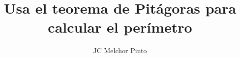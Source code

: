 \documentclass[12pt,addpoints]{guia}
\title{Usa el teorema de Pitágoras para calcular el perímetro}
\author{JC Melchor Pinto}
\begin{document}
\INFO%
\begin{multicols}{2}%
    
    
    
    \columnbreak
    
    
\end{multicols}
\ejemplosboxed[]
\begin{questions}
    \questionboxed[10]{}
    \questionboxed[10]{}
    \ejemplosboxed[]
    \questionboxed[15]{}
    \ejemplosboxed[]
    \questionboxed[10]{}
    \questionboxed[15]{}
    \ejemplosboxed[]
    \questionboxed[15]{}
    \questionboxed[10]{}
    \questionboxed[15]{}
\end{questions}
\end{document}
